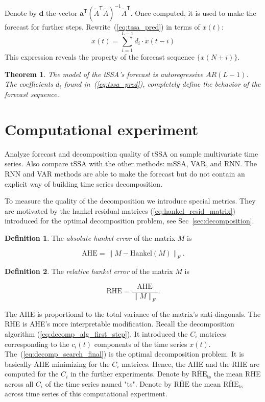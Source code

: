 \documentclass[referee, pdflatex, sn-mathphys-num]{sn-jnl}
\theoremstyle{definition}
\newtheorem{Def}{Definition}
\theoremstyle{plain}
\newtheorem{Th}{Theorem}
\begin{document}
	Denote by $ \mathbf{d} $ the vector $ \mathbf{a}^{\mathsf{T}} (\tilde{A}^{\mathsf{T}} \tilde{A})^{-1} \tilde{A}^{\mathsf{T}} $. Once computed, it is used to make the forecast for further steps. Rewrite~(\ref{eq:tssa_pred}) in terms of $ x(t) $: \begin{equation*}\label{eq:autoregr}
		x(t) = \sum\limits_{i = 1}^{L - 1} d_i \cdot x(t - i)
	\end{equation*}	This expression reveals the property of the forecast sequence $ \{x(N + i)\} $.
	
	\begin{Th}\label{th:forecast}		
		The model of the tSSA's forecast is \emph{autoregressive} $ AR(L - 1) $. The coefficients $ d_i $ found in~(\ref{eq:tssa_pred}), completely define the behavior of the forecast sequence.
	\end{Th}
	
	\section{Computational experiment}	
	
	Analyze forecast and decomposition quality of tSSA on sample multivariate time series. Also compare tSSA with the other methods: mSSA, VAR, and RNN. The RNN and VAR methods are able to make the forecast but do not contain an explicit way of building time series decomposition.
	
	To measure the quality of the decomposition we introduce special metrics. They are motivated by the hankel residual matrices (\ref{eq:hankel_resid_matrix}) introduced for the optimal decomposition problem, see Sec~\ref{sec:decomposition}.
	
	\begin{Def}
		The \emph{absolute hankel error} of the matrix $ M $ is 
		
		\[
		\text{AHE} = \lVert M - \text{Hankel}(M) \rVert_F.
		\] 
		
	\end{Def}	
	
	\begin{Def}		
		
		The \emph{relative hankel error} of the matrix $ M $ is 
		
		\[
		\text{RHE} = \frac{\text{AHE}}{\lVert M \rVert_F}.
		\] 		
		
	\end{Def}
	
	The AHE is proportional to the total variance of the matrix's anti-diagonals. The RHE is AHE's more interpretable modification. Recall the decomposition algorithm (\ref{eq:decomp_alg_first_step}). It introduced the $ C_i $ matrices corresponding to the $ c_i(t) $ components of the time series $ x(t) $. The~(\ref{eq:decomp_search_final}) is the optimal decomposition problem. It is basically AHE minimizing for the $ C_i $ matrices. Hence, the AHE and the RHE are computed for the $ C_i $ in the further experiments. Denote by $ \overline{\text{RHE}}_{\text{ts}} $ the mean RHE across all $ C_i $ of the time series named "ts". Denote by $ \overline{\text{RHE}} $ the mean $ \overline{\text{RHE}}_{\text{ts}} $ across time series of this computational experiment.
	
\end{document}
